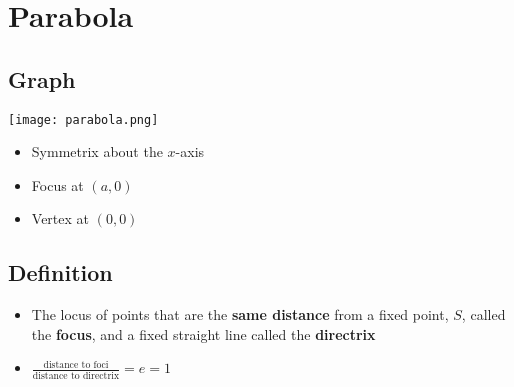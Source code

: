 


\section{Parabola}
\subsection{Graph}
\texttt{[image: parabola.png]}
\begin{itemize}
    \item Symmetrix about the $x$-axis
    \item Focus at $(a, 0)$
    \item Vertex at $(0, 0)$
\end{itemize}
\subsection{Definition}
\begin{itemize}
    \item The locus of points that are the \textbf{same distance} from a fixed point, $S$,
          called the \textbf{focus}, and a fixed straight line called the \textbf{directrix}
    \item $\frac{\text{distance to foci}}{\text{distance to directrix}} = e = 1$
\end{itemize}

